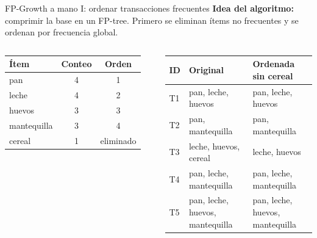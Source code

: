 \documentclass[10pt,aspectratio=169]{beamer}
\begin{document}
\begin{frame}[fragile]{FP-Growth a mano I: ordenar transacciones frecuentes}
\scriptsize
\textbf{Idea del algoritmo:} comprimir la base en un FP-tree. Primero se eliminan ítems no frecuentes y se ordenan por frecuencia global.

\begin{columns}[T]
\begin{table}
\centering
\begin{tabular}{lcc}
\toprule
Ítem & Conteo & Orden \\
\midrule
pan & 4 & 1 \\
leche & 4 & 2 \\
huevos & 3 & 3 \\
mantequilla & 3 & 4 \\
cereal & 1 & eliminado \\
\bottomrule
\end{tabular}
\end{table}

\begin{table}
\centering
\begin{tabular}{lll}
\toprule
ID & Original & Ordenada sin cereal \\
\midrule
T1 & pan, leche, huevos & pan, leche, huevos \\
T2 & pan, mantequilla & pan, mantequilla \\
T3 & leche, huevos, cereal & leche, huevos \\
T4 & pan, leche, mantequilla & pan, leche, mantequilla \\
T5 & pan, leche, huevos, mantequilla & pan, leche, huevos, mantequilla \\
\bottomrule
\end{tabular}
\end{table}
\end{columns}
\end{frame}
\end{document}

